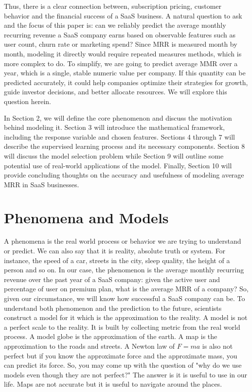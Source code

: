 \documentclass[12pt]{article}
\begin{document}
Thus, there is a clear connection between, subscription pricing, customer behavior and the financial success of a SaaS business. A natural question to ask and the focus of this paper is: can we reliably predict the average monthly recurring revenue a SaaS company earns based on observable features such as user count, churn rate or marketing spend? Since MRR is measured month by month, modeling it directly would require repeated measures methods, which is more complex to do. To simplify, we are going to predict average MMR over a year, which is a single, stable numeric value per company. If this quantity can be predicted accurately, it could help companies optimize their strategies for growth, guide investor decisions, and better allocate resources. We will explore this question herein. 

In Section 2, we will define the core phenomenon and discuss the motivation behind modeling it. Section 3 will introduce the mathematical framework, including the response variable and chosen features. Sections 4 through 7 will describe the supervised learning process and its necessary components. Section 8 will discuss the model selection problem while Section 9 will outline some potential use of real-world applications of the model. Finally, Section 10 will provide concluding thoughts on the accuracy and usefulness of modeling average MRR in SaaS businesses.

\section{Phenomena and Models}

A phenomena is the real world process or behavior we are trying to understand or predict. We can also say that it is reality, absolute truth or system. For instance, the speed of a car, streets in the city, sleep quality, the height of a person and so on. In our case, the phenomenon is the average monthly recurring revenue over the past year of a SaaS company: given the active user and percentage of user on premium plan, what is the average MRR of a company? So, given our circumstance, we will know how successful a SaaS company can be. To understand both phenomenon and the prediction to the future, scientists construct a model for it which is the approximation to the reality. A model is not a perfect scale to the reality. It is built by collecting metric from the real world process. A model globe is the approximation of the earth. A map is the approximation to the roads and streets. A Newton law of $F = ma$ is also not perfect but if you know the approximate force and the approximate mass, you can predict its force. So, you may come up with the question of "why do we use models even though they are not perfect?" The answer is it is useful to use in our life. Maps are not accurate but it is useful to navigate around the places. 
\end{document}
